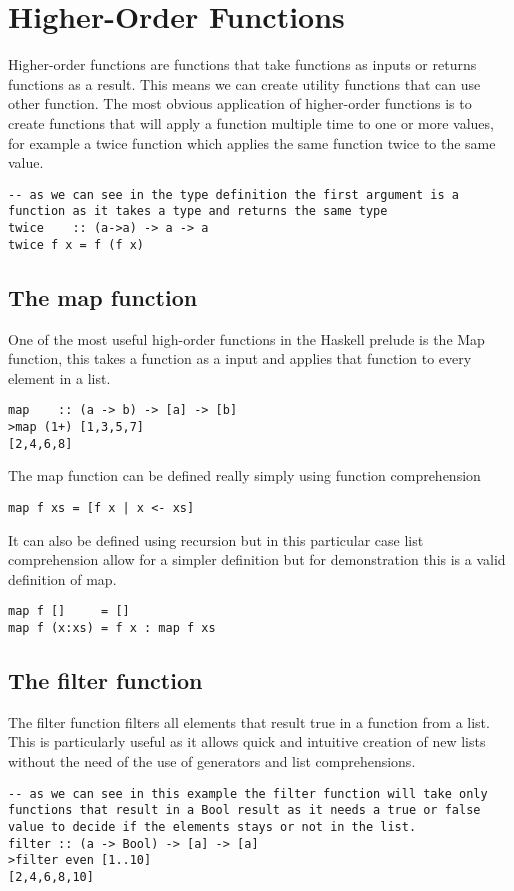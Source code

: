 \documentclass[12pt, oneside]{article}
\begin{document}
\section{Higher-Order Functions}
Higher-order functions are functions that take functions as inputs or returns functions as a result. This means we can create utility functions that can use other function. The most obvious application of higher-order functions is to create functions that will apply a function multiple time to one or more values, for example a twice function which applies the same function twice to the same value. 
\begin{lstlisting}
-- as we can see in the type definition the first argument is a function as it takes a type and returns the same type
twice    :: (a->a) -> a -> a
twice f x = f (f x)
\end{lstlisting}

\subsection{The map function}
One of the most useful high-order functions in the Haskell prelude is the Map function, this takes a function as a input and applies that function to every element in a list.
\begin{lstlisting}
map    :: (a -> b) -> [a] -> [b]
>map (1+) [1,3,5,7]
[2,4,6,8]
\end{lstlisting}
The map function can be defined really simply using function comprehension 
\begin{lstlisting}
map f xs = [f x | x <- xs]
\end{lstlisting}
It can also be defined using recursion but in this particular case list comprehension allow for a simpler definition but for demonstration this is a valid definition of map.
\begin{lstlisting}
map f []     = []
map f (x:xs) = f x : map f xs
\end{lstlisting}

\subsection{The filter function}
The filter function filters all elements that result true in a function from a list. This is particularly useful as it allows quick and intuitive creation of new lists without the need of the use of generators and list comprehensions.
\begin{lstlisting}
-- as we can see in this example the filter function will take only functions that result in a Bool result as it needs a true or false value to decide if the elements stays or not in the list.
filter :: (a -> Bool) -> [a] -> [a]
>filter even [1..10]
[2,4,6,8,10]
\end{lstlisting}
\end{document}
